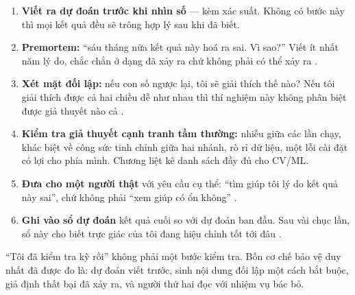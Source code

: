 \documentclass[../hieu-suat.tex]{subfiles}
\begin{document}
\begin{enumerate}
\item \textbf{Viết ra dự đoán trước khi nhìn số} --- kèm xác suất. Không có bước này thì mọi kết quả đều sẽ trông hợp lý sau khi đã biết.
\item \textbf{Premortem:} ``sáu tháng nữa kết quả này hoá ra sai. Vì sao?'' Viết ít nhất năm lý do, chắc chắn ở dạng đã xảy ra chứ không phải có thể xảy ra \cite{mitchell1989,klein2007}.
\item \textbf{Xét mặt đối lập:} nếu con số ngược lại, tôi sẽ giải thích thế nào? Nếu tôi giải thích được cả hai chiều dễ như nhau thì thí nghiệm này không phân biệt được giả thuyết nào cả \cite{lord1984} \nM{}.
\item \textbf{Kiểm tra giả thuyết cạnh tranh tầm thường:} nhiễu giữa các lần chạy, khác biệt về công sức tinh chỉnh giữa hai nhánh, rò rỉ dữ liệu, một lỗi cài đặt có lợi cho phía mình. Chương  liệt kê danh sách đầy đủ cho CV/ML.
\item \textbf{Đưa cho một người thật} với yêu cầu cụ thể: ``tìm giúp tôi lý do kết quả này sai'', chứ không phải ``xem giúp có ổn không'' \cite{mercier2011,dunbar1997}.
\item \textbf{Ghi vào sổ dự đoán} kết quả cuối so với dự đoán ban đầu. Sau vài chục lần, sổ này cho biết trực giác của tôi đang hiệu chỉnh tốt tới đâu \cite{mellers2015}.
\end{enumerate}

\begin{cannho}
``Tôi đã kiểm tra kỹ rồi'' không phải một bước kiểm tra. Bốn cơ chế bảo vệ duy nhất đã được đo là: dự đoán viết trước, sinh nội dung đối lập một cách bắt buộc, giả định thất bại đã xảy ra, và người thứ hai đọc với nhiệm vụ bác bỏ.
\end{cannho}

\begin{traloi}
\end{traloi}
\end{document}
